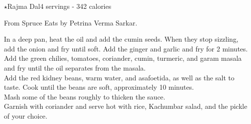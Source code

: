 \begin{recipe}{\texorpdfstring{$\star$}{str}Rajma Dal}{4 servings - 342 calories}{}

\freeform From Spruce Eats by Petrina Verma Sarkar.


In a deep pan, heat the oil and add the cumin seeds. When they stop sizzling, add the onion and fry until soft. Add the ginger and garlic and fry for 2 minutes.\\

Add the green chilies, tomatoes, coriander, cumin, turmeric, and garam masala and fry until the oil separates from the masala.\\

Add the red kidney beans, warm water, and asafoetida, as well as the salt to taste. Cook until the beans are soft, approximately 10 minutes.\\

Mash some of the beans roughly to thicken the sauce.\\

Garnish with coriander and serve hot with rice, Kachumbar salad, and the pickle of your choice.

\end{recipe}
